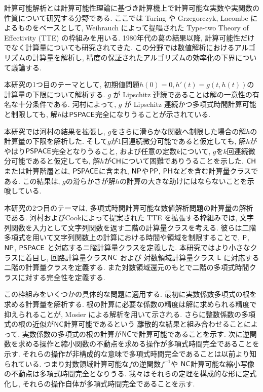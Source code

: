 \begin{jabstract}
計算可能解析とは計算可能性理論に基づき計算機上で計算可能な実数や実関数の
性質について研究する分野である.
ここでは Turing や Grzegorczyk, Lacombe によるものをベースとして,
Weihrauch によって提唱された Type-two Theory of Effectivity (TTE) の枠組みを用いる.
1980年代の葛の結果以降, 計算可能性だけでなく計算量についても研究されてきた.
この分野では数値解析におけるアルゴリズムの計算量を解析し,
精度の保証されたアルゴリズムの効率化の下界について議論する.


本研究の1つ目のテーマとして, 
初期値問題$h(0)=0, h'(t) = g(t, h(t))$の計算量の下限について解析する.
$g$ が Lipschitz 連続であることは解の一意性の有名な十分条件である.
河村によって, $g$ が Lipschitz 連続かつ多項式時間計算可能と制限しても,
解$h$は$\mathsf{PSPACE}$完全になりうることが示されている.


本研究では河村の結果を拡張し,
$g$をさらに滑らかな関数へ制限した場合の解$h$の計算量の下限を解析した.
そして$g$が$1$回連続微分可能であると仮定しても,
解$h$がやはり$\mathsf{PSPACE}$完全となりうること,
および任意の定数$k$について, $g$を$k$回連続微分可能であると仮定しても,
解$h$が$\mathsf{CH}$について困難でありうることを示した.
$\mathsf{CH}$または計算階層とは, $\mathsf{PSPACE}$に含まれ, 
$\mathsf{NP}$や$\mathsf{PP}$, $\mathsf{PH}$などを含む計算量クラスである.
この結果は, $g$の滑らかさが解$h$の計算の大きな助けにはならないことを示唆している.


本研究の2つ目のテーマは, 
多項式時間計算可能な数値解析問題の計算量の解析である.
河村およびCookによって提案された TTE を拡張する枠組みでは,
文字列関数を入力として文字列関数を返す二階の計算量クラスを考える.
彼らは二階多項式を用いて文字列関数上の計算における時間や領域を制限することで,
$\mathsf{P}$, $\mathsf{NP}$, $\mathsf{PSPACE}$ と対応するニ階計算量クラスを定義した.
本研究ではより小さなクラスに着目し, 回路計算量クラス$\mathsf{NC}$ および
対数領域計算量クラス $\mathsf{L}$ に対応する二階の計算量クラスを定義する.
また対数領域還元のもとで二階の多項式時間クラスに対する完全性を定義する.

この枠組みをいくつかの具体的な問題に適用する.
最初に実数係数多項式の根を求める計算量を解析する.
根の計算に必要な係数の精度は解に求められる精度で抑えられることが,
Mosier による解析を用いて示される.
さらに整数係数の多項式の根の近似が$\mathsf{NC}$計算可能であるという
離散的な結果と組み合わせることによって,
実数係数の多項式の根の計算が$\mathsf{NC}$で計算可能であることを示す.
次に逆関数を求める操作と縮小関数の不動点を求める操作が多項式時間完全であることを示す.
それらの操作が非構成的な意味で多項式時間完全であることは以前より知られている.
つまり対数領域計算可能な$f$の逆関数$f^{-1}$や
$\mathsf{NC}$計算可能な縮小写像の不動点は多項式時間完全となりうる.
我々はそれらの定理を構成的な形に定式化し,
それらの操作自体が多項式時間完全であることを示す.
\end{jabstract}

